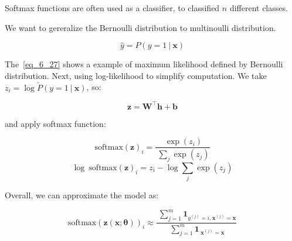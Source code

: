 %
%
%
%
%
%

  Softmax functions are often used as a classifier, to classified $n$ different classes.

  We want to gereralize the Bernoulli distribution to multinoulli distribution.

  \begin{equation} \tag{6.27}
    \label{eq_6_27}
    \hat{y} = P( y=1\ |\ \bm{x} )
  \end{equation}

  The~\eqref{eq_6_27} shows a example of maximum likelihood defined by Bernoulli distribution.
  Next, using log-likelihood to simplify computation. We take $z _ i = \log \tilde{P}( y=1\ |\ \bm{x} )$, so:

  \begin{equation} \tag{6.28}
    \label{eq_6_28}
    \bm{z} = \bm{W} ^ \top \bm{h} + \bm{b}
  \end{equation}

  and apply softmax function:

  \begin{equation} \tag{6.29}
    \label{eq_6_29}
    \mathrm{softmax}{( \bm{z} )} _ i = \frac{\ \exp(z_i) } {\ \sum _ j \exp(z_j) }
  \end{equation}
  \begin{equation} \tag{6.30}
    \label{eq_6_30}
    \log\ \mathrm{softmax}{( \bm{z} )} _ i = z_i - \log \sum _ j \exp(z_j)
  \end{equation}

  Overall, we can approximate the model as:

  \begin{equation} \tag{6.31}
    \label{eq_6_31}
    \mathrm{softmax}{( \bm{z}( \bm{x};\bm{\theta} ) )} _ i \approx
      \frac{\ \sum ^ m _ {j=1} \bm{1} _ {y ^ {(j)} = i, \bm{x} ^ {(j)} = \bm{x}} }
        {\ \sum ^ m _ {j=1} \bm{1} _ {\ \bm{x} ^ {(j)} = \bm{x}} }
  \end{equation}

